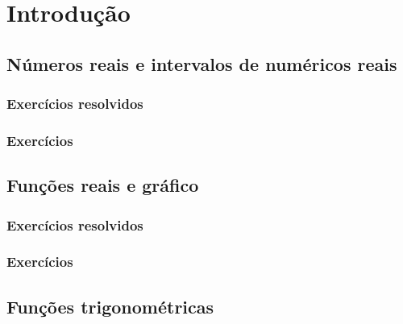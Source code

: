
\chapter{Introdução}\label{chap:introducao}


\section{Números reais e intervalos de numéricos reais}\label{sec:intro_reais}
\construirSec

\subsection*{Exercícios resolvidos}

\construirExeresol


\subsection*{Exercícios}

\construirExer


\section{Funções reais e gráfico}\label{sec:intro_fun_reais}
\construirSec

\subsection*{Exercícios resolvidos}

\construirExeresol


\subsection*{Exercícios}

\construirExer


\section{Funções trigonométricas}\label{sec:intro_trigo}
\construirSec

